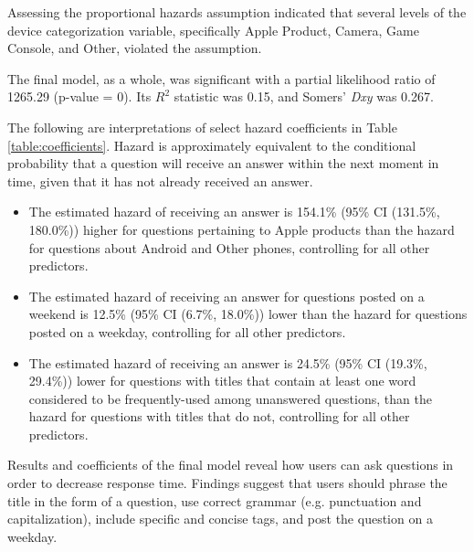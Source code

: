 \documentclass{article}
\begin{document}
Assessing the proportional hazards assumption indicated that several levels of the device categorization variable, specifically Apple Product, Camera, Game Console, and Other, violated the assumption. 

The final model, as a whole, was significant with a partial likelihood ratio of 1265.29 (p-value = 0). Its $R^2$ statistic was 0.15, and Somers' \textit{Dxy} was 0.267. 

The following are interpretations of select hazard coefficients in Table \ref{table:coefficients}. Hazard is approximately equivalent to the conditional probability that a question will receive an answer within the next moment in time, given that it has not already received an answer. 

\begin{itemize}
  \item The estimated hazard of receiving an answer is 154.1\% (95\% CI (131.5\%, 180.0\%)) higher for questions pertaining to Apple products than the hazard for questions about Android and Other phones, controlling for all other predictors.
  \item The estimated hazard of receiving an answer for questions posted on a weekend is 12.5\% (95\% CI (6.7\%, 18.0\%)) lower than the hazard for questions posted on a weekday, controlling for all other predictors.
  \item The estimated hazard of receiving an answer is 24.5\% (95\% CI (19.3\%, 29.4\%)) lower for questions with titles that contain at least one word considered to be frequently-used among unanswered questions, than the hazard for questions with titles that do not, controlling for all other predictors. 
\end{itemize}

Results and coefficients of the final model reveal how users can ask questions in order to decrease response time. Findings suggest that users should phrase the title in the form of a question, use correct grammar (e.g. punctuation and capitalization), include specific and concise tags, and post the question on a weekday. 
\end{document}
